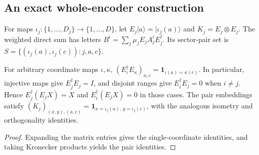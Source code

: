 \subsection{An exact whole-encoder construction}
\label{sec:ldp_exact_sector_encoder}

\begin{definition}
    \label{def:ldp_embedded_sectors}
    \leanok
    For maps $\iota_j:\{1,\ldots,D_j\}\to\{1,\ldots,D\}$, let
    $E_j|a\rangle=|\iota_j(a)\rangle$ and $K_j=E_j\otimes E_j$.
    The weighted direct sum has letters
    $B^i=\sum_j\mu_jE_jA_j^iE_j^\dagger$. Its sector-pair set is
    $S=\{(\iota_j(a),\iota_j(c)):j,a,c\}$.
\end{definition}

\begin{lemma}
    \label{thm:ldp_sector_coordinate_identities}
    \leanok
    For arbitrary coordinate maps $\iota,\kappa$,
    $(E_\iota^\dagger E_\kappa)_{a,c}=\mathbf1_{\iota(a)=\kappa(c)}$.
    In particular, injective maps give $E_j^\dagger E_j=I$, and
    disjoint ranges give $E_i^\dagger E_j=0$ when $i\ne j$.
    Hence $E_j^\dagger(E_jX)=X$ and $E_i^\dagger(E_jX)=0$ in those cases.
    The pair embeddings satisfy
    $(K_j)_{(x,y),(a,c)}=\mathbf1_{x=\iota_j(a),\,y=\iota_j(c)}$,
    with the analogous isometry and orthogonality identities.
\end{lemma}
\begin{proof}\leanok
    Expanding the matrix entries gives the single-coordinate identities,
    and taking Kronecker products yields the pair identities.
\end{proof}

